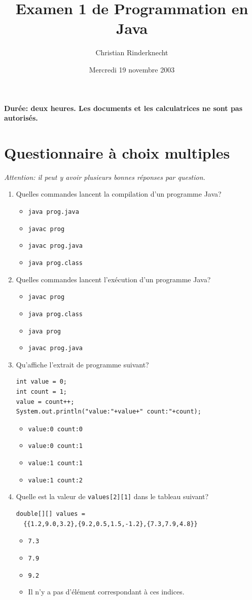 \documentclass[11pt,a4paper]{article}
\title{Examen 1 de Programmation en Java}
\author{Christian Rinderknecht}
\date{Mercredi 19 novembre 2003}
\newcommand{\boxitem}{\item[$\Box$]}
\newcommand{\java}{\textsf{Java}\xspace}
\begin{document}
\maketitle

\noindent
\textbf{Durée: deux heures. Les documents et les calculatrices ne sont
 pas autorisés.}

\smallskip

\section{Questionnaire à choix multiples}

\emph{Attention: il peut y avoir plusieurs bonnes réponses par question.}

\begin{enumerate}

  \item Quelles commandes lancent la compilation d'un programme \java?
  \begin{itemize}
    \boxitem \texttt{java prog.java}
    \boxitem \texttt{javac prog}
    \boxitem \texttt{javac prog.java}
    \boxitem \texttt{java prog.class}
  \end{itemize}

  \item Quelles commandes lancent l'exécution d'un programme \java?
  \begin{itemize}
    \boxitem \texttt{javac prog}
    \boxitem \texttt{java prog.class}
    \boxitem \texttt{java prog}
    \boxitem \texttt{javac prog.java}
  \end{itemize}

  \item Qu'affiche l'extrait de programme suivant?
  \begin{verbatim}
int value = 0;
int count = 1;
value = count++;
System.out.println("value:"+value+" count:"+count);
  \end{verbatim}
  \vspace*{-10pt}
  \begin{itemize}
    \boxitem \verb+value:0 count:0+
    \boxitem \verb+value:0 count:1+
    \boxitem \verb+value:1 count:1+
    \boxitem \verb+value:1 count:2+
  \end{itemize}

  \item Quelle est la valeur de \verb+values[2][1]+ dans le tableau
  suivant?
  \begin{verbatim}
double[][] values =
  {{1.2,9.0,3.2},{9.2,0.5,1.5,-1.2},{7.3,7.9,4.8}}
  \end{verbatim}
  \begin{itemize}
    \boxitem \verb+7.3+
    \boxitem \verb+7.9+
    \boxitem \verb+9.2+
    \boxitem Il n'y a pas d'élément correspondant à ces indices.
  \end{itemize}


\end{enumerate}
\end{document}
